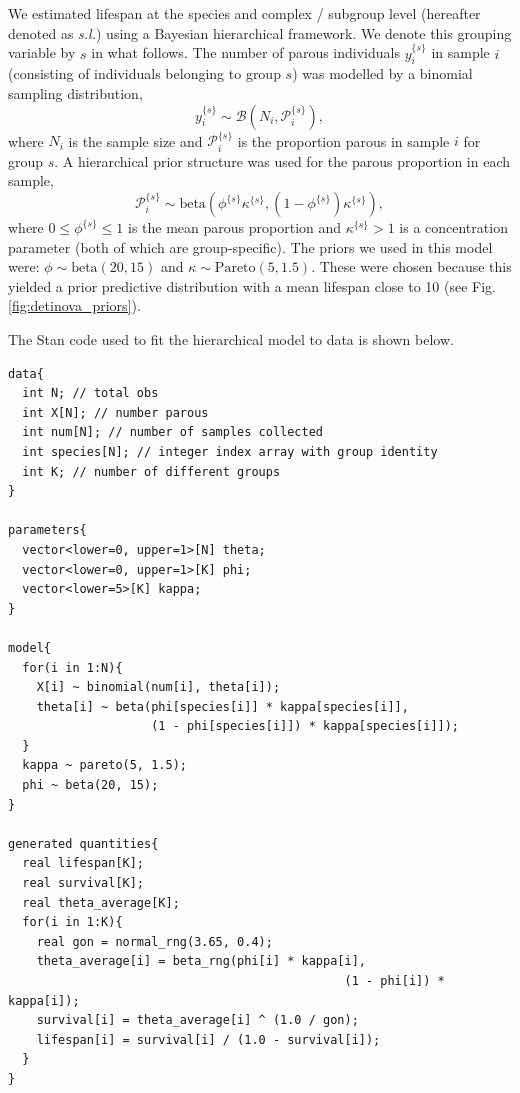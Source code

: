 \documentclass[12pt]{article}
\begin{document}
{We estimated lifespan at the species and complex / subgroup level (hereafter denoted as \textit{s.l.}) using a Bayesian hierarchical framework. We denote this grouping variable by $s$ in what follows. The number of parous individuals $y_i^{\{s\}}$ in sample $i$ (consisting of individuals belonging to group $s$) was modelled by a binomial sampling distribution,
%
\begin{equation}
y_i^{\{s\}} \sim \mathcal{B}(N_i, \mathcal{P}_i^{\{s\}}),
\end{equation}
%
where $N_i$ is the sample size and $\mathcal{P}_i^{\{s\}}$ is the proportion parous in sample $i$ for group $s$. A hierarchical prior structure was used for the parous proportion in each sample,
%
\begin{equation}\label{eq:detinova_prior}
\mathcal{P}_i^{\{s\}}\sim \text{beta}\left(\phi^{\{s\}} \kappa^{\{s\}}, (1-\phi^{\{s\}})\kappa^{\{s\}}\right),
\end{equation}
%
where $0\leq\phi^{\{s\}}\leq 1$ is the mean parous proportion and $\kappa^{\{s\}}>1$ is a concentration parameter (both of which are group-specific). The priors we used in this model were: $\phi\sim \text{beta}(20, 15)$ and $\kappa\sim \text{Pareto}(5, 1.5)$. These were chosen because this yielded a prior predictive distribution with a mean lifespan close to 10 (see Fig. \ref{fig:detinova_priors}).

The Stan code used to fit the hierarchical model to data is shown below.

\begin{verbatim}
data{
  int N; // total obs
  int X[N]; // number parous
  int num[N]; // number of samples collected
  int species[N]; // integer index array with group identity
  int K; // number of different groups
}

parameters{
  vector<lower=0, upper=1>[N] theta;
  vector<lower=0, upper=1>[K] phi;
  vector<lower=5>[K] kappa;
}

model{
  for(i in 1:N){
    X[i] ~ binomial(num[i], theta[i]);
    theta[i] ~ beta(phi[species[i]] * kappa[species[i]],
                    (1 - phi[species[i]]) * kappa[species[i]]);
  }
  kappa ~ pareto(5, 1.5);
  phi ~ beta(20, 15);
}

generated quantities{
  real lifespan[K];
  real survival[K];
  real theta_average[K];
  for(i in 1:K){
    real gon = normal_rng(3.65, 0.4);
    theta_average[i] = beta_rng(phi[i] * kappa[i],
										       (1 - phi[i]) * kappa[i]);
    survival[i] = theta_average[i] ^ (1.0 / gon);
    lifespan[i] = survival[i] / (1.0 - survival[i]); 
  }
}
\end{verbatim}


}
\end{document}
